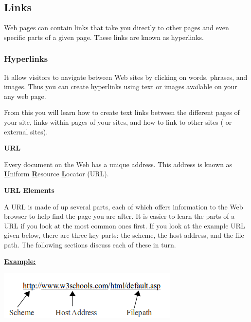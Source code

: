 \documentclass[11pt,a4paper]{article}
\begin{document}
\subsection*{Links}
\hspace{1cm} Web pages can contain links that take you directly to other pages and even specific parts of a given page. These links are known as hyperlinks.\

\subsubsection*{Hyperlinks}

It allow visitors to navigate between Web sites by clicking on words, phrases, and images. Thus you can create hyperlinks using text or images available on your any web page.\

From this you will learn how to create text links between the different pages of your site, links within pages of your sites, and how to link to other sites ( or external sites).\

\textbf{URL}

\hspace{1cm}Every document on the Web has a unique address. This address is known as \underline{\textbf{U}}niform \underline{\textbf{R}}esource \underline{\textbf{L}}ocator (URL).\

\textbf{URL Elements}

\hspace{1cm} A URL is made of up several parts, each of which offers information to the Web browser to help find the page you are after. It is easier to learn the parts of a URL if you look at the most common ones first. If you look at the example URL given below, there are three key parts: the scheme, the host address, and the file path. The following sections discuss each of these in turn.\

\underline{\textbf{Example:}}\

\includegraphics[scale=0.8]{URL.png}
\end{document}
